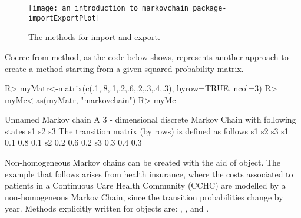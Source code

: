 \documentclass[nojss]{jss}
\begin{document}
\begin{figure}
\begin{center}
\texttt{[image: an\_introduction\_to\_markovchain\_package-importExportPlot]}
\caption{The  methods for import and export.}
\label{fig:fromAndTo}
\end{center}
\end{figure}


Coerce from  method, as the code below shows, represents another approach to create a  method starting from a given squared probability matrix.

\begin{Schunk}
\begin{Sinput}
R> myMatr<-matrix(c(.1,.8,.1,.2,.6,.2,.3,.4,.3), byrow=TRUE, ncol=3)
R> myMc<-as(myMatr, "markovchain")
R> myMc
\end{Sinput}
\begin{Soutput}
Unnamed Markov chain 
 A  3 - dimensional discrete Markov Chain with following states 
 s1 s2 s3 
 The transition matrix   (by rows)  is defined as follows 
    s1  s2  s3
s1 0.1 0.8 0.1
s2 0.2 0.6 0.2
s3 0.3 0.4 0.3
\end{Soutput}
\end{Schunk}


Non-homogeneous Markov chains can be created with the aid of  object. The example that follows arises from health insurance, where the costs associated to patients in a Continuous Care Health Community (CCHC) are modelled by a non-homogeneous Markov Chain, since the 
transition probabilities change by year. Methods explicitly written for
 objects are: , ,   and
\code{[}.
\end{document}
